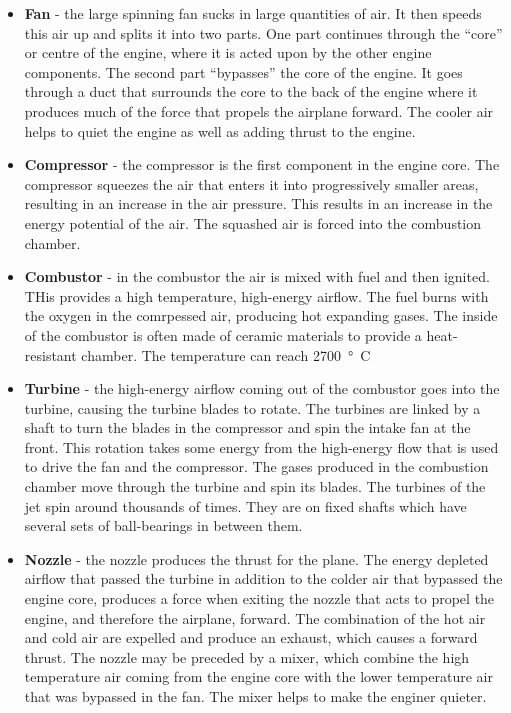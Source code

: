 \begin{itemize}
    \item \textbf{Fan} - the large spinning fan sucks in large quantities of air. It then speeds this air up and splits it into two parts. One part continues through the ``core'' or centre of the engine, where it is acted upon by the other engine components. The second part ``bypasses'' the core of the engine. It goes through a duct that surrounds the core to the back of the engine where it produces much of the force that propels the airplane forward. The cooler air helps to quiet the engine as well as adding thrust to the engine.
    \item \textbf{Compressor} - the compressor is the first component in the engine core. The compressor squeezes the air that enters it into progressively smaller areas, resulting in an increase in the air pressure. This results in an increase in the energy potential of the air. The squashed air is forced into the combustion chamber. 
    \item \textbf{Combustor} - in the combustor the air is mixed with fuel and then ignited. THis provides a high temperature, high-energy airflow. The fuel burns with the oxygen in the comrpessed air, producing hot expanding gases. The inside of the combustor is often made of ceramic materials to provide a heat-resistant chamber. The temperature can reach \SI{2700}{\degree C}
    \item \textbf{Turbine} - the high-energy airflow coming out of the combustor goes into the turbine, causing the turbine blades to rotate. The turbines are linked by a shaft to turn the blades in the compressor and spin the intake fan at the front. This rotation takes some energy from the high-energy flow that is used to drive the fan and the compressor. The gases produced in the combustion chamber move through the turbine and spin its blades. The turbines of the jet spin around thousands of times. They are on fixed shafts which have several sets of ball-bearings in between them.
    \item \textbf{Nozzle} - the nozzle produces the thrust for the plane. The energy depleted airflow that passed the turbine in addition to the colder air that bypassed the engine core, produces a force when exiting the nozzle that acts to propel the engine, and therefore the airplane, forward. The combination of the hot air and cold air are expelled and produce an exhaust, which causes a forward thrust. The nozzle may be preceded by a mixer, which combine the high temperature air coming from the engine core with the lower temperature air that was bypassed in the fan. The mixer helps to make the enginer quieter. 
\end{itemize}

